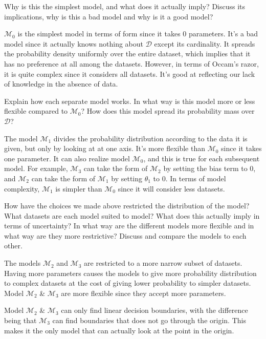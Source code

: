 \documentclass[12pt]{article}
\newenvironment{question}[2][Question]{\begin{trivlist}
\kern10pt
\item[\hskip \labelsep {\bfseries #1}\hskip \labelsep {\bfseries #2.}]}{\end{trivlist}}
\newcommand*{\answer}{%
  \par
  \kern1pt
  \begingroup
    \centering
    \raisebox{.2\baselineskip}{%
      \textcolor{gray}{
	    \rule{.6667\linewidth}{.1pt}%
      }
    }%
    \par
  \kern8pt
  \endgroup
}
\begin{document}
\begin{question}{21}
Why is this the simplest model, and what does it actually imply? Discuss its implications, why is this a bad model and why is it a good model?

\answer

$\mathcal{M}_0$ is the simplest model in terms of form since it takes 0 parameters. It's a bad model since it actually knows nothing about $\mathcal{D}$ except its cardinality. It spreads the probability density uniformly over the entire dataset, which implies that it has no preference at all among the datasets. However, in terms of Occam's razor, it is quite complex since it considers all datasets. It's good at reflecting our lack of knowledge in the absence of data.
\end{question}

\begin{question}{22}
Explain how each separate model works. In what way is this model more or less flexible compared to $\mathcal{M}_0$? How does this model spread its probability mass over $\mathcal{D}$?

\answer

The model $\mathcal{M}_1$ divides the probability distribution according to the data it is given, but only by looking at at one axis. It's more flexible than $\mathcal{M}_0$ since it takes one parameter. It can also realize model $\mathcal{M}_0$, and this is true for each subsequent model. For example, $\mathcal{M}_3$ can take the form of $\mathcal{M}_2$ by setting the bias term to 0, and $\mathcal{M}_2$ can take the form of $\mathcal{M}_1$ by setting $\theta_1$ to 0. In terms of model complexity, $\mathcal{M}_1$ is simpler than $\mathcal{M}_0$ since it will consider less datasets.
\end{question}

\begin{question}{23}
How have the choices we made above restricted the distribution of the model? What datasets are each model suited to model? What does this actually imply in terms of uncertainty? In what way are the different models more flexible and in what way are they more restrictive? Discuss and compare the models to each other.

\answer

The models $\mathcal{M}_2$ and $\mathcal{M}_3$ are restricted to a more narrow subset of datasets. Having more parameters causes the models to give more probability distribution to complex datasets at the cost of giving lower probability to simpler datasets. Model $\mathcal{M}_2$ \& $\mathcal{M}_3$ are more flexible since they accept more parameters.

Model $\mathcal{M}_2$ \& $\mathcal{M}_3$ can only find linear decision boundaries, with the difference being that $\mathcal{M}_3$ can find boundaries that does not go through the origin. This makes it the only model that can actually look at the point in the origin.
\end{question}
\end{document}
